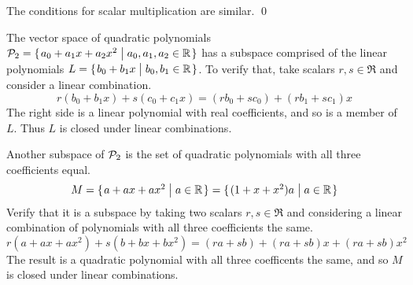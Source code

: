 \documentclass[10pt,t]{beamer}
\begin{document}
\begin{frame}
\lm[th:SubspIffClosed]

\pause\medskip
{}
\end{frame}\begin{frame}
\pf[th:SubspIffClosed]

\pause
The conditions for scalar multiplication are similar.
\qed
\end{frame}




\begin{frame}
\ex
The vector space of quadratic polynomials
$\mathcal{P}_2=\mbox{$\{\hspace{0.1em}a_0+a_1x+a_2x^2\bigm| a_0,a_1,a_2\in\mathbb{R}\hspace{0.1em}\}$}$ has a subspace
comprised of the linear polynomials
$L=\mbox{$\{\hspace{0.1em}b_0+b_1x\bigm| b_0,b_1\in\mathbb{R}\hspace{0.1em}\}$}$.
To verify that, take scalars $r,s\in\Re$ and consider a linear combination.
\begin{equation*}
  r(b_0+b_1x)+s(c_0+c_1x)=(rb_0+sc_0)+(rb_1+sc_1)x
\end{equation*}
The right side is a linear polynomial with real coefficients, and so is a 
member of $L$.
Thus $L$ is closed under linear combinations.

\pause
\ex
Another subspace of $\mathcal{P}_2$ is the set of quadratic polynomials
with all three coefficients equal.
\begin{equation*}
  M=\mbox{$\{\hspace{0.1em}a+ax+ax^2\bigm| a\in\mathbb{R}\hspace{0.1em}\}$}
   =\mbox{$\{\hspace{0.1em}(1+x+x^2)a\bigm| a\in\mathbb{R}\hspace{0.1em}\}$}
\end{equation*}
Verify that it is a subspace by taking two scalars $r,s\in\Re$
and considering a linear combination of polynomials with all 
three coefficients the same.
\begin{equation*}
  r(a+ax+ax^2)+s(b+bx+bx^2)
  =(ra+sb)+(ra+sb)x+(ra+sb)x^2
\end{equation*}
The result is a quadratic polynomial with all three coefficents the same, 
and so $M$ is closed under linear combinations.
\end{frame}
\end{document}
